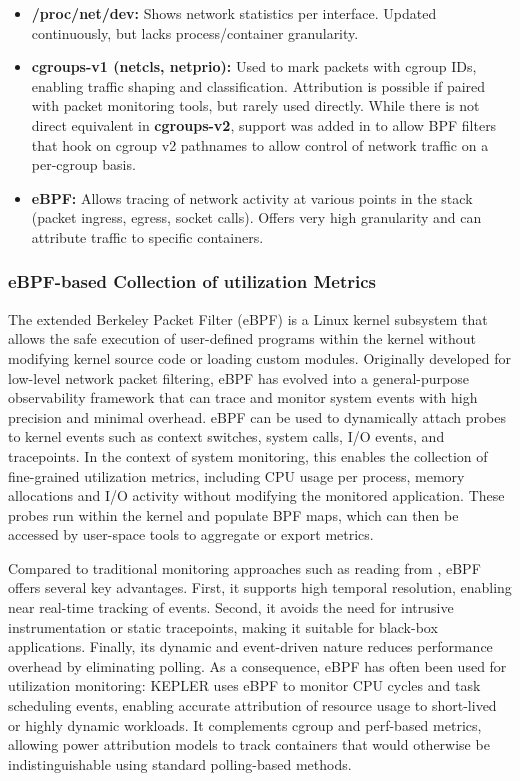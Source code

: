 \begin{itemize}
    \item \textbf{/proc/net/dev:} Shows network statistics per interface. Updated continuously, but lacks process/container granularity.
    \item \textbf{cgroups-v1 (net\textunderscore cls, net\textunderscore prio):} Used to mark packets with cgroup IDs, enabling traffic shaping and classification. Attribution is possible if paired with packet monitoring tools, but rarely used directly. While there is not direct equivalent in \textbf{cgroups-v2}, support was added in  to allow BPF filters that hook on cgroup v2 pathnames to allow control of network traffic on a per-cgroup basis.
    \item \textbf{eBPF:} Allows tracing of network activity at various points in the stack (packet ingress, egress, socket calls). Offers very high granularity and can attribute traffic to specific containers.
\end{itemize}

\subsubsection{eBPF-based Collection of utilization Metrics}
\label{sec:ebpf_metrics}

The extended Berkeley Packet Filter (eBPF) is a Linux kernel subsystem that allows the safe execution of user-defined programs within the kernel without modifying kernel source code or loading custom modules. Originally developed for low-level network packet filtering, eBPF has evolved into a general-purpose observability framework that can trace and monitor system events with high precision and minimal overhead. eBPF can be used to dynamically attach probes to kernel events such as context switches, system calls, I/O events, and tracepoints. In the context of system monitoring, this enables the collection of fine-grained utilization metrics, including CPU usage per process, memory allocations and I/O activity without modifying the monitored application. These probes run within the kernel and populate BPF maps, which can then be accessed by user-space tools to aggregate or export metrics.

Compared to traditional monitoring approaches such as reading from , eBPF offers several key advantages. First, it supports high temporal resolution, enabling near real-time tracking of events. Second, it avoids the need for intrusive instrumentation or static tracepoints, making it suitable for black-box applications. Finally, its dynamic and event-driven nature reduces performance overhead by eliminating polling. As a consequence, eBPF has often been used for utilization monitoring: KEPLER uses eBPF to monitor CPU cycles and task scheduling events, enabling accurate attribution of resource usage to short-lived or highly dynamic workloads. It complements cgroup and perf-based metrics, allowing power attribution models to track containers that would otherwise be indistinguishable using standard polling-based methods.


